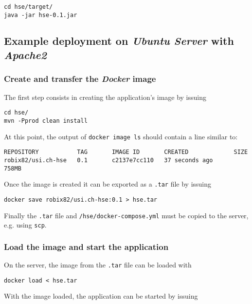 \documentclass[fleqn]{article}
\begin{document}
\begin{verbatim}
cd hse/target/
java -jar hse-0.1.jar
\end{verbatim}

\subsection{Example deployment on \emph{Ubuntu Server} with \emph{Apache2}}

\subsubsection{Create and transfer the \emph{Docker} image}

The first step consists in creating the application's image by issuing

\begin{verbatim}
cd hse/
mvn -Pprod clean install
\end{verbatim}

At this point, the output of \texttt{docker image ls} should contain a line similar to:

\begin{verbatim}
REPOSITORY           TAG       IMAGE ID       CREATED             SIZE
robix82/usi.ch-hse   0.1       c2137e7cc110   37 seconds ago      758MB
\end{verbatim}

Once the image is created it can be exported as a \texttt{.tar} file by issuing

\begin{verbatim}
docker save robix82/usi.ch-hse:0.1 > hse.tar
\end{verbatim}

Finally the \texttt{.tar} file and \texttt{/hse/docker-compose.yml} must be copied to the server, e.g. using \texttt{scp}.

\subsubsection{Load the image and start the application}

On the server, the image from the \texttt{.tar} file can be loaded with

\begin{verbatim}
docker load < hse.tar
\end{verbatim}

With the image loaded, the application can be started by issuing
\end{document}
